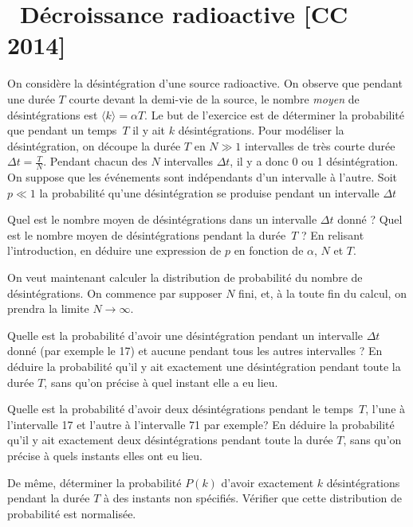 \documentclass[utf8, 11pt]{feuille}
\begin{document}



\section{\soft~Décroissance radioactive [CC 2014]}

On considère la désintégration d'une source radioactive. On observe que pendant une durée $T$ courte devant la demi-vie de la source, le nombre \emph{moyen} de désintégrations est $\langle k \rangle =\alpha T$. Le but de l'exercice est de déterminer la probabilité que pendant un temps~$T$ il y ait $k$ désintégrations. Pour modéliser la désintégration, on découpe la durée $T$ en $N\gg1$ intervalles de très courte durée $\Delta t=\frac{T}{N}$. Pendant chacun des $N$ intervalles $\Delta t$, il y a donc 0 ou 1 désintégration. On suppose que les événements sont indépendants d'un intervalle à l'autre. Soit $p\ll1$ la probabilité qu'une désintégration se produise pendant un intervalle $\Delta t$

\medskip

\question
Quel est le nombre moyen de désintégrations dans un intervalle $\Delta t$ donné ?  Quel est le nombre moyen de désintégrations pendant la durée~$T$ ? En relisant l'introduction, en déduire une expression de $p$ en fonction de $\alpha$, $N$ et $T$.\label{decrad1}

\medskip

On veut maintenant calculer la distribution de probabilité du nombre de désintégrations. On commence par supposer $N$ fini, et, à la toute fin du calcul, on prendra la limite $N\to\infty$.

\question
Quelle est la probabilité d'avoir une désintégration pendant un intervalle $\Delta t$ donné (par exemple le 17) et aucune pendant tous les autres intervalles ? En déduire la probabilité qu'il y ait exactement une désintégration pendant toute la durée $T$, sans qu'on précise à quel instant elle a eu lieu.\label{decrad2}

\question
Quelle est la probabilité d'avoir deux désintégrations pendant le temps~$T$, l'une à l'intervalle 17 et l'autre à l'intervalle 71 par exemple? En déduire la probabilité qu'il y ait exactement deux désintégrations pendant toute la durée $T$, sans qu'on précise à quels instants elles ont eu lieu. \label{decrad3}

\question
De même, déterminer la probabilité $P(k)$ d'avoir exactement $k$ désintégrations pendant la durée $T$ à des instants non spécifiés. Vérifier que cette distribution de probabilité est normalisée.
\end{document}
